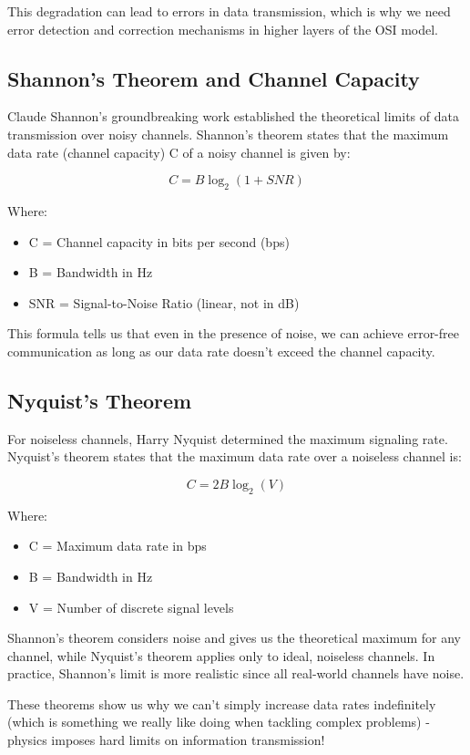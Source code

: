 This degradation can lead to errors in data transmission, which is why we need error detection and correction mechanisms in higher layers of the OSI model.

\subsection*{Shannon's Theorem and Channel Capacity}
Claude Shannon's groundbreaking work established the theoretical limits of data transmission over noisy channels. Shannon's theorem states that the maximum data rate (channel capacity) C of a noisy channel is given by:

\begin{equation}
C = B \log_2(1 + SNR)
\end{equation}

Where:
\begin{itemize}
    \item C = Channel capacity in bits per second (bps)
    \item B = Bandwidth in Hz
    \item SNR = Signal-to-Noise Ratio (linear, not in dB)
\end{itemize}

This formula tells us that even in the presence of noise, we can achieve error-free communication as long as our data rate doesn't exceed the channel capacity.

\subsection*{Nyquist's Theorem}
For noiseless channels, Harry Nyquist determined the maximum signaling rate. Nyquist's theorem states that the maximum data rate over a noiseless channel is:

\begin{equation}
C = 2B \log_2(V)
\end{equation}

Where:
\begin{itemize}
    \item C = Maximum data rate in bps
    \item B = Bandwidth in Hz
    \item V = Number of discrete signal levels
\end{itemize}

\begin{importantblock}
    Shannon's theorem considers noise and gives us the theoretical maximum for any channel, while Nyquist's theorem applies only to ideal, noiseless channels. In practice, Shannon's limit is more realistic since all real-world channels have noise.
\end{importantblock}

These theorems show us why we can't simply increase data rates indefinitely (which is something we really like doing when tackling complex problems) - physics imposes hard limits on information transmission!